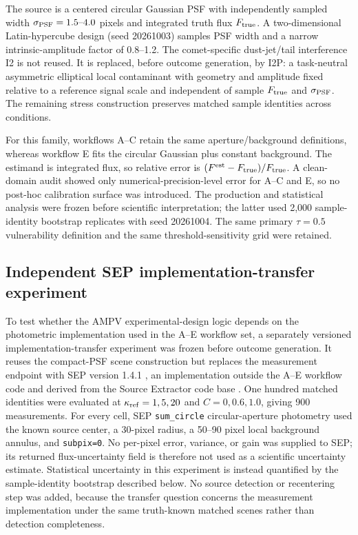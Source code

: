 The source is a centered circular Gaussian PSF with independently
sampled width \(\sigma_{\rm PSF}=1.5\text{--}4.0\) pixels and integrated
truth flux \(F_{\rm true}\). A two-dimensional Latin-hypercube design
(seed 20261003) samples PSF width and a narrow intrinsic-amplitude factor
of 0.8--1.2. The comet-specific dust-jet/tail interference I2 is not
reused. It is replaced, before outcome generation, by I2P: a
task-neutral asymmetric elliptical local contaminant with geometry and
amplitude fixed relative to a reference signal scale and independent of
sample \(F_{\rm true}\) and \(\sigma_{\rm PSF}\). The remaining
stress construction preserves matched sample identities across
conditions.

For this family, workflows A--C retain the same aperture/background
definitions, whereas workflow E fits the circular Gaussian plus constant
background. The estimand is integrated flux, so relative error is
\((F^{\rm est}-F_{\rm true})/F_{\rm true}\). A clean-domain audit
showed only numerical-precision-level error for A--C and E, so no
post-hoc calibration surface was introduced. The production and
statistical analysis were frozen before scientific interpretation; the
latter used 2,000 sample-identity bootstrap replicates with seed
20261004. The same primary \(\tau=0.5\) vulnerability definition and
the same threshold-sensitivity grid were retained.

\subsection{Independent SEP implementation-transfer experiment}
\label{sep-transfer-experiment}

To test whether the AMPV experimental-design logic depends on the
photometric implementation used in the A--E workflow set, a separately
versioned implementation-transfer experiment was frozen before outcome
generation. It reuses the compact-PSF scene construction but replaces the
measurement endpoint with SEP version 1.4.1 \cite{ref11}, an implementation outside
the A--E workflow code and derived from the Source Extractor code base
\cite{ref3}. One hundred matched identities were evaluated at
\(\kappa_{\rm ref}=1,5,20\) and \(C=0,0.6,1.0\), giving 900
measurements. For every cell, SEP \texttt{sum\_circle} circular-aperture photometry used the
known source center, a 30-pixel radius, a 50--90 pixel local
background annulus, and \texttt{subpix=0}. No per-pixel error, variance,
or gain was supplied to SEP; its returned flux-uncertainty field is
therefore not used as a scientific uncertainty estimate. Statistical
uncertainty in this experiment is instead quantified by the
sample-identity bootstrap described below. No source detection or recentering step was added,
because the transfer question concerns the measurement implementation
under the same truth-known matched scenes rather than detection
completeness.

